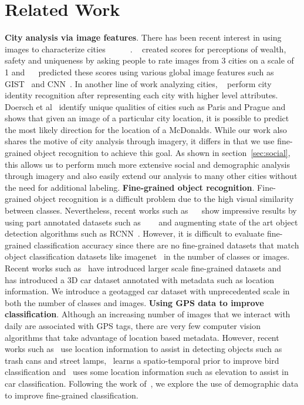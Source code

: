 \documentclass[10pt,twocolumn,letterpaper]{article}
\begin{document}
\section{Related Work}
\label{sec:related}
\textbf{City analysis via image features}. There has been recent interest in using images to characterize cities~\cite{mit_plos_1}~\cite{tamara}~\cite{paris}~\cite{antonio}~\cite{mit_cvpr}~\cite{mcdonalds}. ~\cite{mit_plos_1} created scores for perceptions of wealth, safety and uniqueness by asking people to rate images from 3 cities on a scale of 1 and ~\cite{mit_cvpr}~\cite{tamara} predicted these scores using various global image features such as GIST~\cite{gist} and CNN~\cite{cnn}. In another line of work analyzing cities, ~\cite{antonio} perform city identity recognition after representing each city with higher level attributes. Doersch et al~\cite{paris} identify unique qualities of cities such as Paris and Prague and~\cite{mcdonalds} shows that given an image of a particular city location, it is possible to predict the most likely direction for the location of a McDonalds. While our work also shares the motive of city analysis through imagery, it differs in that we use fine-grained object recognition to achieve this goal. As shown in section~\ref{sec:social}, this allows us to perform much more extensive social and demographic analysis through imagery and also easily extend our analysis to many other cities without the need for additional labeling. \newline\newline
\textbf{Fine-grained object recognition}. Fine-grained object recognition is a difficult problem due to the high visual similarity between classes. Nevertheless, recent works such as ~\cite{ning}~\cite{cars} show impressive results by using part annotated datasets such as ~\cite{birds}~\cite{dogs}~\cite{cars} and augmenting state of the art object detection algorithms such as RCNN~\cite{rcnn}. However, it is difficult to evaluate fine-grained classification accuracy since there are no fine-grained datasets that match object classification datasets like imagenet~\cite{imagenet} in the number of classes or images. Recent works such as~\cite{birdsnap} have introduced larger scale fine-grained datasets and ~\cite{nyc3d} has introduced a 3D car dataset annotated with metadata such as location information. We introduce a geotagged car dataset with unprecedented scale in both the number of classes and images.\newline\newline
\textbf{Using GPS data to improve classification}. Although an increasing number of images that we interact with daily are associated with GPS tags, there are very few computer vision algorithms that take advantage of location based metadata. However, recent works such as~\cite{amir} use location information to assist in detecting objects such as trash cans and street lamps,~\cite{birdsnap} learns a spatio-temporal prior to improve bird classification and~\cite{nyc3d} uses some location information such as elevation to assist in car classification. Following the work of~\cite{birdsnap}, we explore the use of demographic data to improve fine-grained classification.
\end{document}
